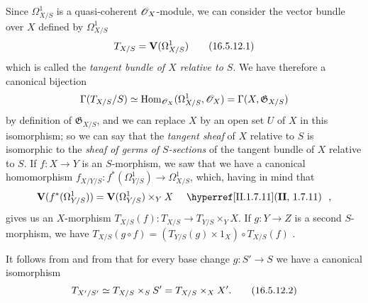 \begin{env}[16.5.12]
\label{IV.16.5.12}
Since $\Omega_{X/S}^1$ is a quasi-coherent $\mathscr{O}_X$-module, we can consider the vector bundle over $X$ defined by $\Omega_{X/S}^1$ 
\[
  \label{IV.16.5.12.1}
  T_{X/S} = \mathbf{V}(\Omega_{X/S}^1)
  \tag{16.5.12.1}
\]
which is called the \emph{tangent bundle of $X$ relative to $S$}.
We have therefore a canonical bijection 
\[
  \Gamma(T_{X/S}/S) \simeq \operatorname{Hom}_{\mathscr{O}_X}(\Omega_{X/S}^1, \mathscr{O}_X) = \Gamma(X, \mathfrak{G}_{X/S})
\]
by definition of $\mathfrak{G}_{X/S}$, and we can replace $X$ by an open set $U$ of $X$ in this isomorphism;
so we can say that the \emph{tangent sheaf} of $X$ relative to $S$ is isomorphic to the \emph{sheaf of germs of $S$-sections} of the tangent bundle of $X$ relative to $S$.
If $f:X \to Y$ is an $S$-morphism, we saw  that we have a canonical homomorphism $f_{X/Y/S}:f^*(\Omega_{Y/S}^1) \to \Omega_{X/S}^1$, which, having in mind that
\[
  \bb{V}(f^*(\Omega_{Y/S}^1)) = \bb{V}(\Omega_{Y/S}^1) \times_Y X \quad \text{\sref[II]{II.1.7.11} },
\]
gives us an $X$-morphism $T_{X/S}(f): T_{X/S} \to T_{Y/S} \times_Y X$.
If $g:Y \to Z$ is a second $S$-morphism, we have $T_{X/S}(g \circ f) = (T_{Y/S}(g) \times 1_X ) \circ T_{X/S}(f)$ .

It follows from  and from  that for every base change $g:S' \to S$ we have a canonical isomorphism
\[
  \label{IV.16.5.12.2}
  T_{X'/S'} \simeq T_{X/S} \times_S S' = T_{X/S} \times_X X'.
  \tag{16.5.12.2}
\]
\end{env}

